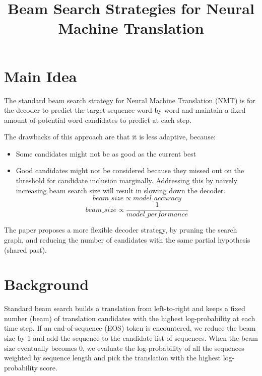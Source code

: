 \documentclass[12pt]{scrartcl}
\begin{document}
\title{Beam Search Strategies for Neural Machine Translation}
\author{}
\date{}
\maketitle

\section{Main Idea}
  The standard beam search strategy for Neural Machine Translation (NMT) is for the decoder to predict the target sequence word-by-word and maintain a fixed amount of potential word candidates to predict at each step. 
  
  The drawbacks of this approach are that it is less adaptive, because: 
  \begin{itemize}
    \item Some candidates might not be as good as the current best
    \item Good candidates might not be considered because they missed out on the threshold for candidate inclusion marginally. Addressing this by naively increasing beam search size will result in slowing down the decoder.
    $$beam\_size \propto model\_accuracy$$
    $$beam\_size \propto \frac{1}{model\_performance}$$
  \end{itemize}

  The paper proposes a more flexible decoder strategy, by pruning the search graph, and reducing the number of candidates with the same partial hypothesis (shared past).

\section{Background}
  Standard beam search builds a translation from left-to-right and keeps a fixed
  number (beam) of translation candidates with the highest log-probability at each time step. If an end-of-sequence (EOS) token is encountered, we reduce the beam size by 1 and add the sequence to the candidate list of sequences. When the beam size eventually becomes 0, we evaluate the log-probability of all the sequences weighted by sequence length and pick the translation with the highest log-probability score.
\end{document}
